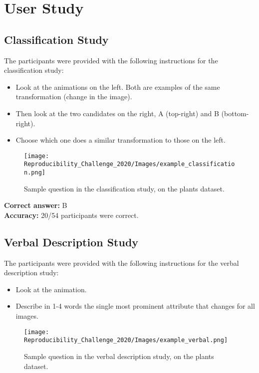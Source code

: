 \newpage
\appendix

\section{User Study}\label{appendix:user-study}

\subsection{Classification Study}
The participants were provided with the following instructions for the classification study:

\begin{itemize}
    \item Look at the animations on the left. Both are examples of the same transformation (change in the image).
    \item Then look at the two candidates on the right, A (top-right) and B (bottom-right).
    \item Choose which one does a similar transformation to those on the left.
\end{itemize}

\begin{figure}[h!]
    \centering
    \texttt{[image: Reproducibility\_Challenge\_2020/Images/example\_classification.png]}
    \caption{Sample question in the classification study, on the plants dataset.}
    \label{fig:sample-plants-classification}
\end{figure}

\textbf{Correct answer:} B \\
\textbf{Accuracy:} 20/54 participants were correct.

\subsection{Verbal Description Study}
The participants were provided with the following instructions for the verbal description study:

\begin{itemize}
    \item Look at the animation.
    \item Describe in 1-4 words the single most prominent attribute that changes for all images.
\end{itemize}

\begin{figure}[h!]
    \centering
    \texttt{[image: Reproducibility\_Challenge\_2020/Images/example\_verbal.png]}
    \caption{Sample question in the verbal description study, on the plants dataset.}
    \label{fig:sample-plants-verbal}
\end{figure}

